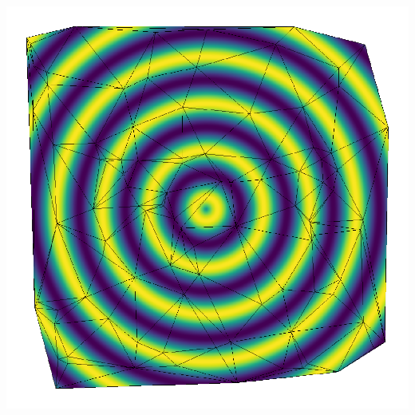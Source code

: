 \documentclass[10pt]{amsart}
\numberwithin{equation}{section}
\newenvironment{Figure}
{\par\medskip\noindent\minipage{\linewidth}}
{\endminipage\par\medskip}
\theoremstyle{definition}
\begin{document}
\begin{multicols}{2}
  \begin{Figure}
     \begin{center}
      \includegraphics[width=0.7\linewidth]{mesh.png}
     \end{center}
  \end{Figure}

\end{multicols}
\end{document}

